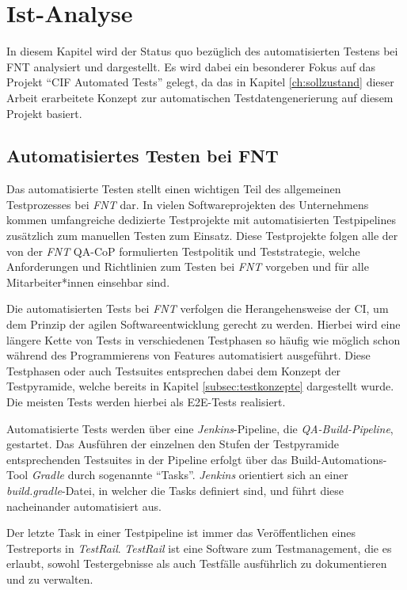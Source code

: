 
\chapter{Ist-Analyse}\label{ch:istanalyse}
In diesem Kapitel wird der Status quo bezüglich des automatisierten Testens bei FNT analysiert und dargestellt. Es wird dabei ein besonderer Fokus auf das Projekt \enquote{CIF Automated Tests} gelegt, da das in Kapitel \ref{ch:sollzustand} dieser Arbeit erarbeitete Konzept zur automatischen Testdatengenerierung auf diesem Projekt basiert.

\section{Automatisiertes Testen bei FNT}\label{sec:autotestsfnt}
Das automatisierte Testen stellt einen wichtigen Teil des allgemeinen Testprozesses bei \textit{FNT} dar. In vielen Softwareprojekten des Unternehmens kommen umfangreiche dedizierte Testprojekte mit automatisierten Testpipelines zusätzlich zum manuellen Testen zum Einsatz. Diese Testprojekte folgen alle der von der \textit{FNT} \ac{QA}-\ac{CoP} formulierten Testpolitik und Teststrategie, welche Anforderungen und Richtlinien zum Testen bei \textit{FNT} vorgeben und für alle Mitarbeiter*innen einsehbar sind. \cite{fnt:2020} \cite{fntstrat:2021}

Die automatisierten Tests bei \textit{FNT} verfolgen die Herangehensweise der \ac{CI}, um dem Prinzip der agilen Softwareentwicklung gerecht zu werden. \cite{fntstrat:2021} Hierbei wird eine längere Kette von Tests in verschiedenen Testphasen so häufig wie möglich schon während des Programmierens von Features automatisiert ausgeführt. Diese Testphasen oder auch Testsuites entsprechen dabei dem Konzept der Testpyramide, welche bereits in Kapitel \ref{subsec:testkonzepte} dargestellt wurde. \cite{fntstrat:2021} Die meisten Tests werden hierbei als \ac{E2E}-Tests realisiert.

Automatisierte Tests werden über eine \textit{Jenkins}-Pipeline, die \textit{QA-Build-Pipeline}, gestartet. Das Ausführen der einzelnen den Stufen der Testpyramide entsprechenden Testsuites in der Pipeline erfolgt über das Build-Automations-Tool \textit{Gradle} durch sogenannte \enquote{Tasks}. \textit{Jenkins} orientiert sich an einer \textit{build.gradle}-Datei, in welcher die Tasks definiert sind, und führt diese nacheinander automatisiert aus.

Der letzte Task in einer Testpipeline ist immer das Veröffentlichen eines Testreports in \textit{TestRail}. \textit{TestRail} ist eine Software zum Testmanagement, die es erlaubt, sowohl Testergebnisse als auch Testfälle ausführlich zu dokumentieren und zu verwalten. \cite{testrail:2022} \cite{fntstrat:2021}

